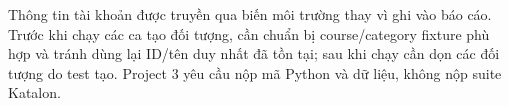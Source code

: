 Thông tin tài khoản được truyền qua biến môi trường thay vì ghi vào báo cáo. Trước khi chạy các ca tạo đối tượng, cần chuẩn bị course/category fixture phù hợp và tránh dùng lại ID/tên duy nhất đã tồn tại; sau khi chạy cần dọn các đối tượng do test tạo. Project 3 yêu cầu nộp mã Python và dữ liệu, không nộp suite Katalon.\cite{prj3brief,prj3source}
